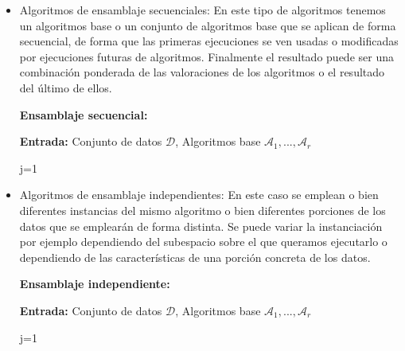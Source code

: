 \begin{itemize}
	\item Algoritmos de ensamblaje secuenciales: En este tipo de algoritmos tenemos un algoritmos base o un conjunto de algoritmos base que se aplican de forma secuencial, de forma que las primeras ejecuciones se ven usadas o modificadas por ejecuciones futuras de algoritmos. Finalmente el resultado puede ser una combinación ponderada de las valoraciones de los algoritmos o el resultado del último de ellos.
	
	
	\begin{algorithm}[H]{\textbf{Ensamblaje secuencial:}}
		\SetAlgoLined
		
		\textbf{Entrada: } Conjunto de datos $\mathcal{D}$, Algoritmos base $\mathcal{A}_1 , ... , \mathcal{A}_r$
		
		j=1
		
	
	\end{algorithm}
	\item Algoritmos de ensamblaje independientes: En este caso se emplean o bien diferentes instancias del mismo algoritmo o bien diferentes porciones de los datos que se emplearán de forma distinta. Se puede variar la instanciación por ejemplo dependiendo del subespacio sobre el que queramos ejecutarlo o dependiendo de las características de una porción concreta de los datos.
	
	\begin{algorithm}[H]{\textbf{Ensamblaje independiente:}}
		\SetAlgoLined
		
		\textbf{Entrada: } Conjunto de datos $\mathcal{D}$, Algoritmos base $\mathcal{A}_1 , ... , \mathcal{A}_r$
		
		j=1
		
		
	\end{algorithm}
\end{itemize}

